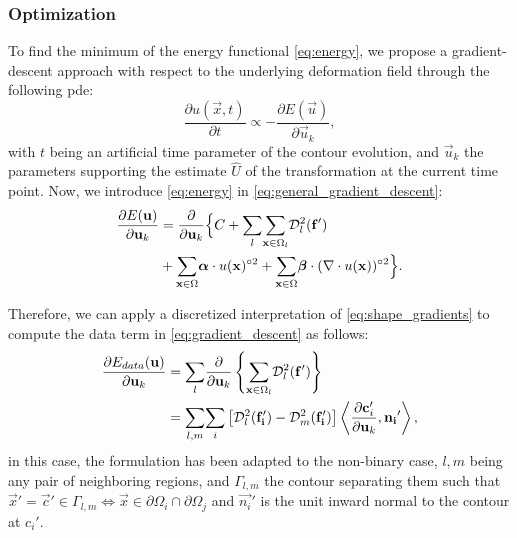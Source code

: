 \subsubsection{Optimization}
\label{sec:gradient_descent}
To find the minimum of the energy functional \eqref{eq:energy},
  we propose a gradient-descent approach with respect to the underlying
  deformation field through the following \gls*{pde}:
  \begin{equation}
  \frac{\partial u(\vec{x},t)}{\partial t} \propto - \frac{\partial E(\vec{u})}{\partial \vec{u}_k},
  \label{eq:general_gradient_descent}
  \end{equation}
  with $t$ being an artificial time parameter of the contour
  evolution, and $\vec{u}_k$ the parameters supporting the estimate
  $\hat{U}$ of the transformation at the current time point.
Now, we introduce \eqref{eq:energy} in \eqref{eq:general_gradient_descent}:
  \begin{align}
  \frac{\partial E(\vec{u})}{\partial \vec{u}_k} &=
  \frac{ \partial }{\partial \vec{u}_k} \Big\{
  C + \underset{l}{\sum}
  \underset{\vec{x} \in \Omega_l}{\sum} \mdist{f'}{l} \notag\\
  &+ \underset{\vec{x} \in \Omega}{\sum} \boldsymbol{\alpha} \cdot u(\vec{x})^{\circ2}
  + \underset{\vec{x} \in \Omega}{\sum} \boldsymbol{\beta} \cdot (\nabla \cdot u(\vec{x}))^{\circ2}
  \Big\}.
  \label{eq:gradient_descent}
  \end{align}

Therefore, we can apply a discretized interpretation of \eqref{eq:shape_gradients}
  to compute the data term in \eqref{eq:gradient_descent} as follows:
  \begin{align}
  \frac{\partial E_{data}(\vec{u})}{\partial \vec{u}_k} &=
  \underset{l}{\sum} \frac{ \partial }{\partial \vec{u}_k} \left\{
   \underset{\vec{x} \in \Omega_l}{\sum} \mdist{f'}{l} \right\} \notag\\
  &= \underset{l,m}{\sum} \underset{i}{\sum}
  \left[ \mdist{f_i'}{l} - \mdist{f_i'}{m} \right]
  \left\langle \frac{\partial \vec{c}_i'}{\partial \vec{u}_k}, \vec{n_i}'\right\rangle,
  \label{eq:gradient_wshape}
  \end{align}
  in this case, the formulation has been adapted to the non-binary case, $l,m$
  being any pair of neighboring regions, and $\Gamma_{l,m}$ the contour separating
  them such that $\vec{x}' = \vec{c}' \in\Gamma_{l,m} \iff \vec{x}\in \partial\Omega_i \cap \partial\Omega_j$
  and $\vec{n_i}'$ is the unit inward normal to the contour at $c_i'$.

